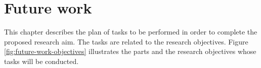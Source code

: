 \chapter{Future work}
\label{ch:closing}

This chapter describes the plan of tasks to be performed in order to complete the proposed research aim. The tasks are related to the research objectives. Figure \ref{fig:future-work-objectives} illustrates the parts and the research objectives whose tasks will be conducted.


